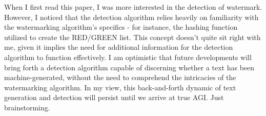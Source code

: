 \documentclass{article}
\begin{document}
When I first read this paper, I was more interested in the detection of watermark. However, I noticed that the detection algorithm relies heavily on familiarity with the watermarking algorithm's specifics - for instance, the hashing function utilized to create the RED/GREEN list. This concept doesn't quite sit right with me, given it implies the need for additional information for the detection algorithm to function effectively. I am optimistic that future developments will bring forth a detection algorithm capable of discerning whether a text has been machine-generated, without the need to comprehend the intricacies of the watermarking algorithm. In my view, this back-and-forth dynamic of text generation and detection will persist until we arrive at true AGI. Just brainstorming.



\end{document}
